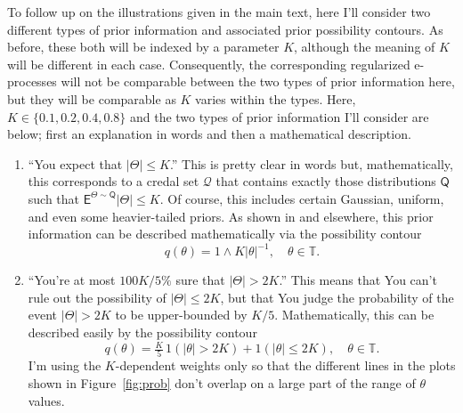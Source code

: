 \documentclass[a4paper, 12pt]{article}
\theoremstyle{plain}
\theoremstyle{definition}
\theoremstyle{remark}
\newcommand{\prob}{\mathsf{P}}
\newcommand{\E}{\mathsf{E}}
\newcommand{\nm}{{\sf N}}
\newcommand{\chisq}{{\sf ChiSq}}
\newcommand{\TT}{\mathbb{T}}
\newcommand{\prior}{\mathsf{Q}}
\newcommand{\credal}{\mathscr{Q}}
\begin{document}
To follow up on the illustrations given in the main text, here I'll consider two different types of prior information and associated prior possibility contours.  As before, these both will be indexed by a parameter $K$, although the meaning of $K$ will be different in each case.  Consequently, the corresponding regularized e-processes will not be comparable between the two types of prior information here, but they will be comparable as $K$ varies within the types.  Here, $K \in \{0.1, 0.2, 0.4, 0.8\}$ and the two types of prior information I'll consider are below; first an explanation in words and then a mathematical description. 
\begin{enumerate}
\item ``You expect that $|\Theta| \leq K$.'' This is pretty clear in words but, mathematically, this corresponds to a credal set $\credal$ that contains exactly those distributions $\prior$ such that $\E^{\Theta \sim \prior}|\Theta| \leq K$.  Of course, this includes certain Gaussian, uniform, and even some heavier-tailed priors. As shown in \citet{dubois.etal.2004} and elsewhere, this prior information can be described mathematically via the possibility contour 
\[ q(\theta) = 1 \wedge K|\theta|^{-1}, \quad \theta \in \TT. \]
\item ``You're at most $100K/5\%$ sure that $|\Theta| > 2K$.'' This means that You can't rule out the possibility of $|\Theta| \leq 2K$, but that You judge the probability of the event $|\Theta| > 2K$ to be upper-bounded by $K/5$.  Mathematically, this can be described easily by the possibility contour 
\[ q(\theta) = \tfrac{K}{5} \, 1(|\theta| > 2K) + 1( |\theta| \leq 2K ), \quad \theta \in \TT. \]
I'm using the $K$-dependent weights only so that the different lines in the plots shown in Figure~\ref{fig:prob} don't overlap on a large part of the range of $\theta$ values. 
\end{enumerate} 
\end{document}

